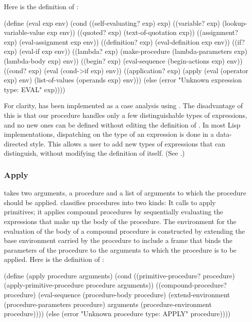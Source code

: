 \noindent
Here is the definition of :

\begin{codeBlock}
(define (eval exp env)
  (cond ((self-evaluating? exp) exp)
        ((variable? exp) (lookup-variable-value exp
                                                env))
        ((quoted? exp) (text-of-quotation exp))
        ((assignment? exp) (eval-assignment exp env))
        ((definition? exp) (eval-definition exp env))
        ((if? exp) (eval-if exp env))
        ((lambda? exp)
          (make-procedure (lambda-parameters exp)
                          (lambda-body exp)
                          env))
        ((begin? exp)
         (eval-sequence (begin-actions exp) env))
        ((cond? exp) (eval (cond->if exp) env))
        ((application? exp)
         (apply (eval (operator exp) env)
                (list-of-values (operands exp) env)))
        (else
         (error "Unknown expression type: EVAL" exp))))
\end{codeBlock}

\noindent
For clarity,  has been implemented as a case analysis using
.  The disadvantage of this is that our procedure handles only a few
distinguishable types of expressions, and no new ones can be defined without
editing the definition of .  In most Lisp implementations,
dispatching on the type of an expression is done in a data-directed style.
This allows a user to add new types of expressions that  can
distinguish, without modifying the definition of  itself.  (See
.)

\subsubsection*{Apply}

 takes two arguments, a procedure and a list of arguments to which
the procedure should be applied.   classifies procedures into two
kinds: It calls  to apply primitives; it
applies compound procedures by sequentially evaluating the expressions that
make up the body of the procedure.  The environment for the evaluation of the
body of a compound procedure is constructed by extending the base environment
carried by the procedure to include a frame that binds the parameters of the
procedure to the arguments to which the procedure is to be applied.  Here is
the definition of :

\begin{codeBlock}
(define (apply procedure arguments)
  (cond ((primitive-procedure? procedure)
         (apply-primitive-procedure procedure
                                    arguments))
        ((compound-procedure? procedure)
         (eval-sequence
           (procedure-body procedure)
           (extend-environment
             (procedure-parameters procedure)
             arguments
             (procedure-environment procedure))))
        (else
         (error
          "Unknown procedure type: APPLY" procedure))))
\end{codeBlock}

